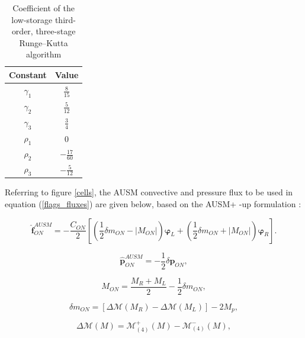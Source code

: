 \documentclass[a5paper]{sapthesis}
\begin{document}
	\begin{table}[h]
		\centering
		\renewcommand{\arraystretch}{1.6} %
		\begin{tabular}{c c}
			\hline
			\textbf{Constant} & \textbf{Value} \\ 
			\hline 
			$\gamma_1$  & $\frac{8}{15}$ \\
			$\gamma_2$  & $\frac{5}{12}$ \\
			$\gamma_3$  & $\frac{3}{4}$ \\
			$\rho_1$    & $0$ \\
			$\rho_2$    & $-\frac{17}{60}$ \\
			$\rho_3$    & $-\frac{5}{12}$ \\  
			\hline
		\end{tabular}
		\vspace{3mm}
		\caption{Coefficient of the low-storage	third-order, three-stage Runge–Kutta algorithm}
		\label{table:RKconstants}
	\end{table}
	
	\noindent Referring to figure \ref{cells}, the AUSM convective and pressure ﬂux to be
	used in equation (\ref{flags_fluxes}) are given below, based on the AUSM+ -up formulation \citep{LIOU_AUSM+-up}:
	
	\begin{equation}
		\mathbf{\hat{f}}_{ON}^{AUSM} = -\frac{C_{ON}}{2} \left[ \left( \frac{1}{2} \delta m_{ON} - |M_{ON}| \right) \mathbf{\varphi}_L + \left( \frac{1}{2} \delta m_{ON} + |M_{ON}| \right) \mathbf{\varphi}_R \right].
	\end{equation}
	
	\begin{equation}
		\mathbf{\hat{p}}_{ON}^{AUSM} = -\frac{1}{2} \delta \mathbf{p}_{ON},
	\end{equation}
	
	\begin{equation}
		M_{ON} = \frac{M_R + M_L}{2} - \frac{1}{2} \delta m_{ON},
	\end{equation}
	
	\begin{equation}
		\delta m_{ON} = \left[ \Delta \mathcal{M}(M_R) - \Delta \mathcal{M}(M_L) \right] - 2M_p,
	\end{equation}
	
	\begin{equation}
		\Delta \mathcal{M}(M) = \mathcal{M}_{(4)}^+ (M) - \mathcal{M}_{(4)}^- (M),
	\end{equation}
	
\end{document}
